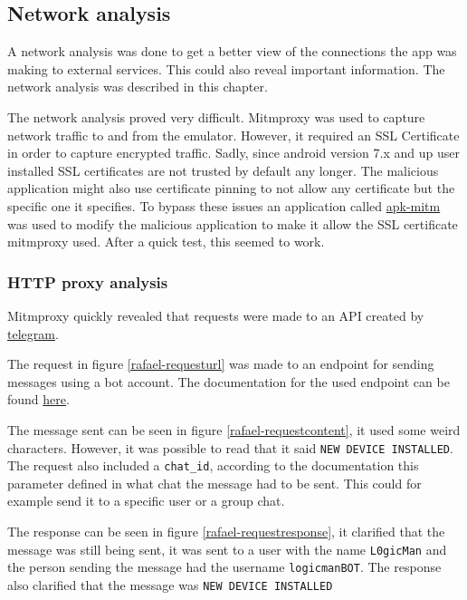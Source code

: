 \subsection{Network analysis}

A network analysis was done to get a better view of the connections the app was making to external services.
This could also reveal important information. The network analysis was described in this chapter.

The network analysis proved very difficult. Mitmproxy was used to capture network traffic to and from the emulator. 
However, it required an SSL Certificate in order to capture encrypted traffic.
Sadly, since android version 7.x and up user installed SSL certificates are not trusted by default any longer.
The malicious application might also use certificate pinning to not allow any certificate but the specific one it specifies.
To bypass these issues an application called \href{https://github.com/shroudedcode/apk-mitm}{apk-mitm} was used to modify the malicious application to make it allow the SSL certificate mitmproxy used.
After a quick test, this seemed to work.

\subsubsection{HTTP proxy analysis}

Mitmproxy quickly revealed that requests were made to an API created by \href{https://telegram.org/}{telegram}.

The request in figure \ref{rafael-requesturl} was made to an endpoint for sending messages using a bot account. 
The documentation for the used endpoint can be found \href{https://core.telegram.org/method/messages.sendMessage}{here}.

The message sent can be seen in figure \ref{rafael-requestcontent}, it used some weird characters.
However, it was possible to read that it said \texttt{NEW DEVICE INSTALLED}.
The request also included a \texttt{chat\_id}, according to the documentation this parameter defined in what chat the message had to be sent.
This could for example send it to a specific user or a group chat.

The response can be seen in figure \ref{rafael-requestresponse}, it clarified that the message was still being sent, 
it was sent to a user with the name \texttt{L0gicMan} and the person sending the message had the username \texttt{logicmanBOT}.
The response also clarified that the message was \texttt{NEW DEVICE INSTALLED}

